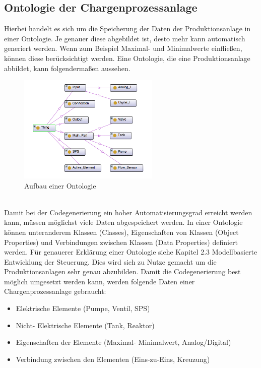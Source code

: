 \subsection{Ontologie der Chargenprozessanlage}
Hierbei handelt es sich um die Speicherung der Daten der Produktionsanlage in einer Ontologie. Je genauer diese abgebildet ist, desto mehr kann automatisch generiert werden. Wenn zum Beispiel Maximal- und Minimalwerte einfließen, können diese berücksichtigt werden.
Eine Ontologie, die eine Produktionsanlage abbildet, kann folgendermaßen aussehen. 
\begin{figure}[hbt!]
 \centering
  \includegraphics[width=0.6\textwidth]{graphics/stateoftheart/Ontology_Aufbau}
  \caption{Aufbau einer Ontologie}
\end{figure}\\
Damit bei der Codegenerierung ein hoher Automatisierungsgrad  erreicht werden kann, müssen möglichst viele Daten abgespeichert werden. In einer Ontologie können unteranderem Klassen (Classes), Eigenschaften von Klassen (Object Properties) und Verbindungen zwischen Klassen (Data Properties) definiert werden. Für genauerer Erklärung einer Ontologie siehe Kapitel 2.3 \glqq Modellbasierte Entwicklung der Steuerung\grqq. Dies wird sich zu Nutze gemacht um die Produktionsanlagen sehr genau abzubilden. Damit die Codegenerierung best möglich umgesetzt werden kann, werden folgende Daten einer Chargenprozessanlage gebraucht:

\begin{itemize}
  \item Elektrische Elemente (Pumpe, Ventil, SPS)
  \item Nicht- Elektrische Elemente (Tank, Reaktor)
  \item Eigenschaften der Elemente (Maximal- Minimalwert, Analog/Digital)
  \item Verbindung zwischen den Elementen (Eins-zu-Eins, Kreuzung)
\end{itemize}

